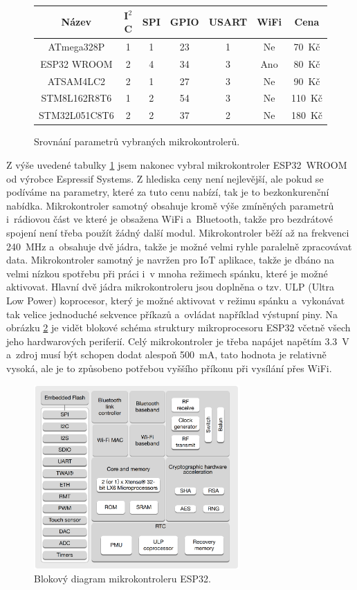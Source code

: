 \begin{figure}[h]
    \centering
    \begin{tabular}{c|cccccc}
        \textbf{Název}                         & \textbf{I$^2$C} & \textbf{SPI} & \textbf{GPIO} & \textbf{USART} & \textbf{WiFi} & \textbf{Cena} \\ \hline
        ATmega328P \cite{dat_ATmega328p}       & 1 & 1 & 23 & 1 & Ne  & 70~Kč \\
        ESP32 WROOM \cite{dat_ESP32-WROOM}     & 2 & 4 & 34 & 3 & Ano & 80~Kč \\
        ATSAM4LC2 \cite{dat_ATSAM4LC2}         & 2 & 1 & 27 & 3 & Ne  & 90~Kč \\
        STM8L162R8T6 \cite{dat_STM8L162R8T6}   & 1 & 2 & 54 & 3 & Ne  & 110~Kč \\
        STM32L051C8T6 \cite{dat_STM32L051C8T6} & 2 & 2 & 37 & 2 & Ne  & 180~Kč
        
    \end{tabular}
    \caption{Srovnání parametrů vybraných mikrokontrolerů.}
    \label{tab_MCU}
\end{figure}

Z výše uvedené tabulky \ref{tab_MCU} jsem nakonec vybral mikrokontroler ESP32~WROOM od výrobce Espressif Systems. Z hlediska ceny není nejlevější, ale pokud se podíváme na parametry, které za tuto cenu nabízí, tak je to bezkonkurenční nabídka. Mikrokontroler samotný obsahuje kromě výše zmíněných parametrů i~rádiovou část ve které je obsažena WiFi a~Bluetooth, takže pro bezdrátové spojení není třeba použít žádný další modul. Mikrokontroler běží až na frekvenci \SI{240}{\mega\hertz} a~obsahuje dvě jádra, takže je možné velmi ryhle paralelně zpracovávat data. Mikrokontroler samotný je navržen pro IoT aplikace, takže je dbáno na velmi nízkou spotřebu při práci i~v mnoha režimech spánku, které je možné aktivovat. Hlavní dvě jádra mikrokontroleru jsou doplněna o tzv. ULP (Ultra Low Power) koprocesor, který je možné aktivovat v režimu spánku a~vykonávat tak velice jednoduché sekvence příkazů a~ovládat například výstupní piny. Na obrázku \ref{fig_ESP32InternalStructure} je vidět blokové schéma struktury mikroprocesoru ESP32 včetně všech jeho hardwarových periferií. Celý mikrokontroler je třeba napájet napětím \SI{3,3}{\volt} a~zdroj musí být schopen dodat alespoň \SI{500}{\milli\ampere}, tato hodnota je relativně vysoká, ale je to způsobeno potřebou vyššího příkonu při vysílání přes WiFi.

\begin{figure}
    \centering
    \includegraphics[width=0.7\textwidth]{obrazky/esp32_internalStructure.png}
    \caption{Blokový diagram mikrokontroleru ESP32.\cite{dat_ESP32-WROOM}}
    \label{fig_ESP32InternalStructure}
\end{figure}


